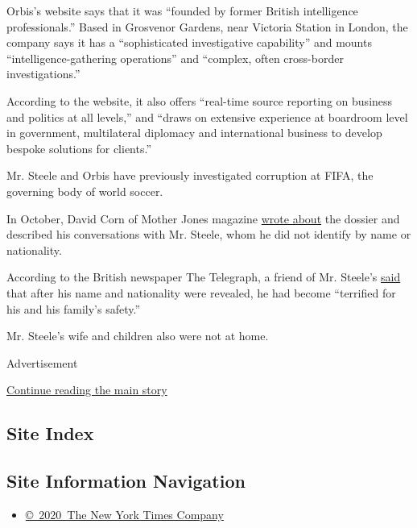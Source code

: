 Orbis's website says that it was ``founded by former British
intelligence professionals.'' Based in Grosvenor Gardens, near Victoria
Station in London, the company says it has a ``sophisticated
investigative capability'' and mounts ``intelligence-gathering
operations'' and ``complex, often cross-border investigations.''

According to the website, it also offers ``real-time source reporting on
business and politics at all levels,'' and ``draws on extensive
experience at boardroom level in government, multilateral diplomacy and
international business to develop bespoke solutions for clients.''

Mr. Steele and Orbis have previously investigated corruption at FIFA,
the governing body of world soccer.

In October, David Corn of Mother Jones magazine
\href{http://www.motherjones.com/politics/2016/10/veteran-spy-gave-fbi-info-alleging-russian-operation-cultivate-donald-trump}{wrote
about} the dossier and described his conversations with Mr. Steele, whom
he did not identify by name or nationality.

According to the British newspaper The Telegraph, a friend of Mr.
Steele's
\href{http://www.telegraph.co.uk/news/2017/01/11/former-mi6-officer-produced-donald-trump-russian-dossier-terrified/}{said}
that after his name and nationality were revealed, he had become
``terrified for his and his family's safety.''

Mr. Steele's wife and children also were not at home.

Advertisement

\protect\hyperlink{after-bottom}{Continue reading the main story}

\hypertarget{site-index}{%
\subsection{Site Index}\label{site-index}}

\hypertarget{site-information-navigation}{%
\subsection{Site Information
Navigation}\label{site-information-navigation}}

\begin{itemize}
\tightlist
\item
  \href{https://help.nytimes.com/hc/en-us/articles/115014792127-Copyright-notice}{©~2020~The
  New York Times Company}
\end{itemize}

